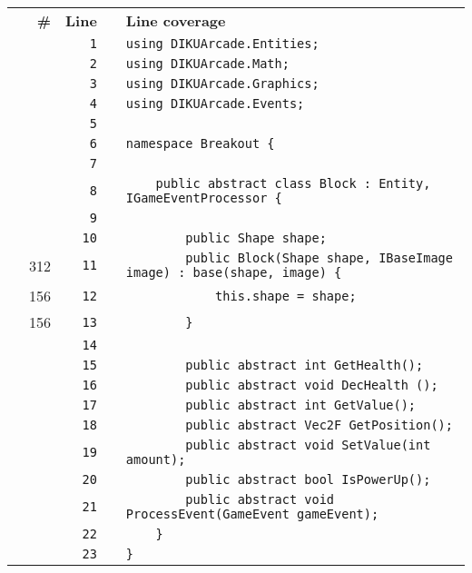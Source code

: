 \documentclass[a4paper,landscape,10pt]{article}
\begin{document}
\begin{longtable}[l]{lrrll}
\textbf{} & \textbf{\#} & \textbf{Line} & \textbf{} & \textbf{Line coverage}\\
\cellcolor{gray} &  & \verb~1~ & & \verb~using DIKUArcade.Entities;~\\
\cellcolor{gray} &  & \verb~2~ & & \verb~using DIKUArcade.Math;~\\
\cellcolor{gray} &  & \verb~3~ & & \verb~using DIKUArcade.Graphics;~\\
\cellcolor{gray} &  & \verb~4~ & & \verb~using DIKUArcade.Events;~\\
\cellcolor{gray} &  & \verb~5~ & & \verb~~\\
\cellcolor{gray} &  & \verb~6~ & & \verb~namespace Breakout {~\\
\cellcolor{gray} &  & \verb~7~ & & \verb~~\\
\cellcolor{gray} &  & \verb~8~ & & \verb~    public abstract class Block : Entity, IGameEventProcessor {~\\
\cellcolor{gray} &  & \verb~9~ & & \verb~~\\
\cellcolor{gray} &  & \verb~10~ & & \verb~        public Shape shape;~\\
\cellcolor{green} & 312 & \verb~11~ & & \verb~        public Block(Shape shape, IBaseImage image) : base(shape, image) {~\\
\cellcolor{green} & 156 & \verb~12~ & & \verb~            this.shape = shape;~\\
\cellcolor{green} & 156 & \verb~13~ & & \verb~        }~\\
\cellcolor{gray} &  & \verb~14~ & & \verb~~\\
\cellcolor{gray} &  & \verb~15~ & & \verb~        public abstract int GetHealth();~\\
\cellcolor{gray} &  & \verb~16~ & & \verb~        public abstract void DecHealth ();~\\
\cellcolor{gray} &  & \verb~17~ & & \verb~        public abstract int GetValue();~\\
\cellcolor{gray} &  & \verb~18~ & & \verb~        public abstract Vec2F GetPosition();~\\
\cellcolor{gray} &  & \verb~19~ & & \verb~        public abstract void SetValue(int amount);~\\
\cellcolor{gray} &  & \verb~20~ & & \verb~        public abstract bool IsPowerUp();~\\
\cellcolor{gray} &  & \verb~21~ & & \verb~        public abstract void ProcessEvent(GameEvent gameEvent);~\\
\cellcolor{gray} &  & \verb~22~ & & \verb~    }~\\
\cellcolor{gray} &  & \verb~23~ & & \verb~}~\\
\end{longtable}
\newpage
\end{document}
